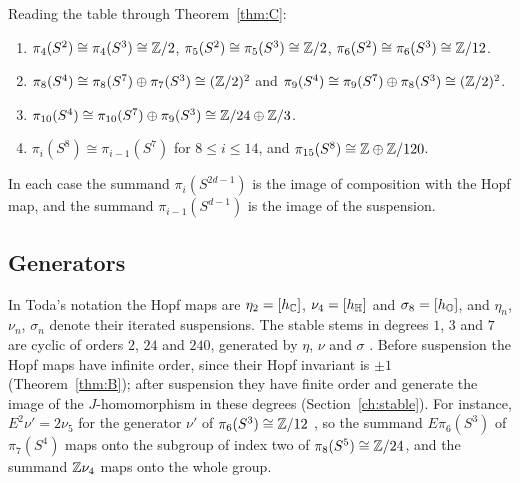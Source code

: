 \begin{example}\label{ex:derived}
Reading the table through Theorem~\ref{thm:C}:
\begin{enumerate}[label=\textup{(\alph*)}]
\item $\pi_4(S^2)\cong\pi_4(S^3)\cong\mathbb{Z}/2$, $\pi_5(S^2)\cong\pi_5(S^3)\cong\mathbb{Z}/2$, $\pi_6(S^2)\cong\pi_6(S^3)\cong\mathbb{Z}/12$.
\item $\pi_8(S^4)\cong\pi_8(S^7)\oplus\pi_7(S^3)\cong(\mathbb{Z}/2)^2$ and $\pi_9(S^4)\cong\pi_9(S^7)\oplus\pi_8(S^3)\cong(\mathbb{Z}/2)^2$.
\item $\pi_{10}(S^4)\cong\pi_{10}(S^7)\oplus\pi_9(S^3)\cong\mathbb{Z}/24\oplus\mathbb{Z}/3$.
\item $\pi_{i}(S^8)\cong\pi_{i-1}(S^7)$ for $8\le i\le14$, and $\pi_{15}(S^8)\cong\mathbb{Z}\oplus\mathbb{Z}/120$.
\end{enumerate}
In each case the summand $\pi_i(S^{2d-1})$ is the image of composition with the Hopf map, and the summand $\pi_{i-1}(S^{d-1})$ is the image of the suspension.
\end{example}

\subsection{Generators}\label{sec:generators}

In Toda's notation \cite{Tod62} the Hopf maps are $\eta_2=[h_{\mathbb{C}}]$, $\nu_4=[h_{\mathbb{H}}]$ and $\sigma_8=[h_{\mathbb{O}}]$, and $\eta_n$, $\nu_n$, $\sigma_n$ denote their iterated suspensions. The stable stems in degrees $1$, $3$ and $7$ are cyclic of orders $2$, $24$ and $240$, generated by $\eta$, $\nu$ and $\sigma$ \cite[Chapters~V and XIV]{Tod62}. Before suspension the Hopf maps have infinite order, since their Hopf invariant is $\pm1$ (Theorem~\ref{thm:B}); after suspension they have finite order and generate the image of the $J$-homomorphism in these degrees (Section~\ref{ch:stable}). For instance, $E^2\nu'=2\nu_5$ for the generator $\nu'$ of $\pi_6(S^3)\cong\mathbb{Z}/12$ \cite[Chapter~V]{Tod62}, so the summand $E\pi_6(S^3)$ of $\pi_7(S^4)$ maps onto the subgroup of index two of $\pi_8(S^5)\cong\mathbb{Z}/24$, and the summand $\mathbb{Z}\nu_4$ maps onto the whole group.
